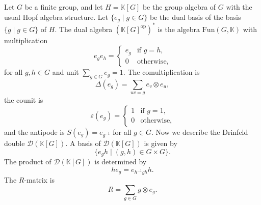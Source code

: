 \begin{example}
Let $G$ be a finite group, and let $H=\mathbb{K}[G]$ be the group algebra of
$G$ with the usual Hopf algebra structure. Let $\{e_{g}\mid g\in G\}$ be the
dual basis of the basis $\{g\mid g\in G\}$ of $H$. The dual algebra
$\left(\mathbb{K}[G]^{\text{op}}\right)^{*}$ is the algebra
$\mathrm{Fun}(G,\mathbb{K})$ with multiplication
\[
e_{g}e_{h}=\begin{cases}
e_{g} & \text{if }g=h,\\
0 & \text{otherwise,}
\end{cases}
\]
for all $g,h\in G$ and unit $\sum_{g\in G}e_{g}=1$. 
The comultiplication
is 
\[
\Delta(e_{g})=\sum_{uv=g}e_{v}\otimes e_{u},
\]
the counit is 
\[
\varepsilon(e_{g})=\begin{cases}
1 & \text{if }g=1,\\
0 & \text{otherwise,}
\end{cases}
\]
and the antipode is 
$S(e_{g})=e_{g^{-1}}$
for all $g\in G$.  Now we describe
the Drinfeld double $\mathcal{D}(\mathbb{K}[G])$.  A basis of
$\mathcal{D}(\mathbb{K}[G])$ is given by
\[
\{e_gh\mid (g,h)\in G\times G\}.
\]
The product of $\mathcal{D}(\mathbb{K}[G])$ is determined by 
\[
he_{g}=e_{h^{-1}gh}h.
\]
The $R$-matrix is
\[
R=\sum_{g\in G}g\otimes e_{g}.
\]
\end{example}

